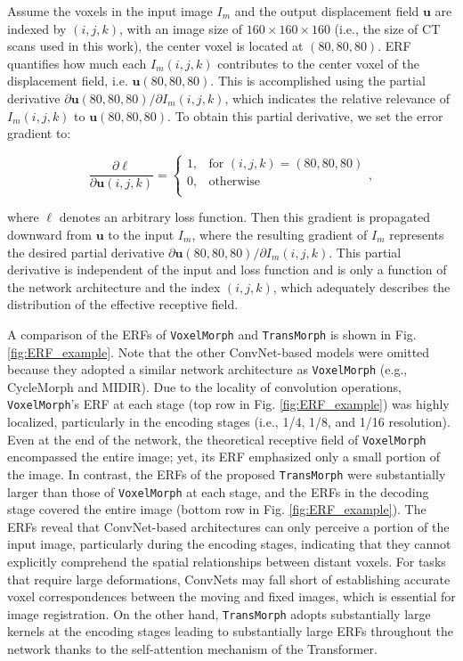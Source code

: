 \documentclass[times,twocolumn,final]{elsarticle}
\begin{document}
Assume the voxels in the input image $I_m$ and the output displacement field $\mathbf{u}$ are indexed by $(i, j, k)$, with an image size of $160\times160\times160$ (i.e., the size of CT scans used in this work), the center voxel is located at $(80, 80, 80)$. ERF quantifies how much each $I_m(i,j,k)$ contributes to the center voxel of the displacement field, i.e. $\mathbf{u}(80,80,80)$. This is accomplished using the partial derivative $\partial\mathbf{u}(80,80,80)/\partial I_m(i,j,k)$, which indicates the relative relevance of $I_m(i,j,k)$ to $\mathbf{u}(80,80,80)$. To obtain this partial derivative, we set the error gradient to:
\begin{linenomath}
\begin{equation}
   \frac{\partial\ell}{\partial\mathbf{u}(i,j,k)} =
  \begin{cases}
    1, & \text{for } (i,j,k)=(80,80,80) \\
    0, & \text{otherwise}\\
  \end{cases},
\end{equation}
\end{linenomath}
where $\ell$ denotes an arbitrary loss function. Then this gradient is propagated downward from $\mathbf{u}$ to the input $I_m$, where the resulting gradient of $I_m$ represents the desired partial derivative $\partial\mathbf{u}(80,80,80)/\partial I_m(i,j,k)$. This partial derivative is independent of the input and loss function and is only a function of the network architecture and the index $(i,j,k)$, which adequately describes the distribution of the effective receptive field.

A comparison of the ERFs of \texttt{VoxelMorph} and \texttt{TransMorph} is shown in Fig. \ref{fig:ERF_example}. Note that the other ConvNet-based models were omitted because they adopted a similar network architecture as \texttt{VoxelMorph} (e.g., CycleMorph and MIDIR). Due to the locality of convolution operations, \texttt{VoxelMorph}'s ERF at each stage (top row in Fig. \ref{fig:ERF_example}) was highly localized, particularly in the encoding stages (i.e., 1/4, 1/8, and 1/16 resolution). Even at the end of the network, the theoretical receptive field of \texttt{VoxelMorph} encompassed the entire image; yet, its ERF emphasized only a small portion of the image. In contrast, the ERFs of the proposed \texttt{TransMorph} were substantially larger than those of \texttt{VoxelMorph} at each stage, and the ERFs in the decoding stage covered the entire image (bottom row in Fig. \ref{fig:ERF_example}). The ERFs reveal that ConvNet-based architectures can only perceive a portion of the input image, particularly during the encoding stages, indicating that they cannot explicitly comprehend the spatial relationships between distant voxels. For tasks that require large deformations, ConvNets may fall short of establishing accurate voxel correspondences between the moving and fixed images, which is essential for image registration. On the other hand, \texttt{TransMorph} adopts substantially large kernels at the encoding stages leading to substantially large ERFs throughout the network thanks to the self-attention mechanism of the Transformer.
\end{document}
